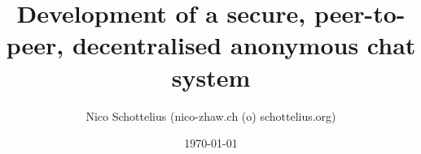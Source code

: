 \documentclass[12pt,a4paper]{report}
\begin{document}
\title{Development of a secure, peer-to-peer, decentralised anonymous chat system}
\date{\today}
\author{Nico Schottelius (nico-zhaw.ch (o) schottelius.org)}
\maketitle
\newpage
\tableofcontents
\listoftables
\listoffigures
\newpage


















\appendix

\end{document}

